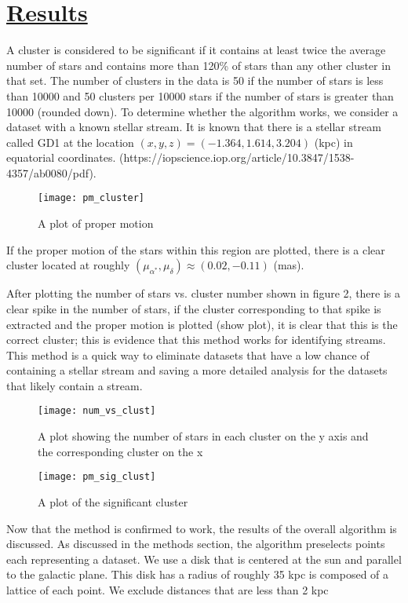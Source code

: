 \documentclass[12pt]{amsart}
\begin{document}
\section{\underline{Results}}
A cluster is considered to be significant if it contains at least twice the average number of stars and contains more than 120\% of stars than any other cluster in that set. The number of clusters in the data is 50 if the number of stars is less than 10000 and 50 clusters per 10000 stars if the number of stars is greater than 10000 (rounded down). To determine whether the algorithm works, we consider a dataset with a known stellar stream. It is known that there is a stellar stream called GD1 at the location $(x,y,z)=(-1.364, 1.614, 3.204)$ (kpc) 
in equatorial coordinates. (https://iopscience.iop.org/article/10.3847/1538-4357/ab0080/pdf). 

\begin{figure}[h]
\centering
\texttt{[image: pm\_cluster]}
\caption{A plot of proper motion}
\end{figure}


If the proper motion of the stars within this region are plotted, there is a clear cluster located at roughly $(\mu_{\alpha^*},\mu_{\delta}) \approx (0.02,-0.11)$ (mas).




After plotting the number of stars vs. cluster number shown in figure 2, there is a clear spike in the number of stars, if the cluster corresponding to that spike is extracted and the proper motion is plotted (show plot), it is clear that this is the correct cluster; this is evidence that this method works for identifying streams. This method is a quick way to eliminate datasets that have a low chance of containing a stellar stream and saving a more detailed analysis for the datasets that likely contain a stream. 

\begin{figure}[h]
\centering
\texttt{[image: num\_vs\_clust]}
\caption{A plot showing the number of stars in each cluster on the y axis and the corresponding cluster on the x}
\end{figure}

\begin{figure}[h]
\centering
\texttt{[image: pm\_sig\_clust]}
\caption{A plot of the significant cluster}
\end{figure}

Now that the method is confirmed to work, the results of the overall algorithm is discussed.
As discussed in the methods section, the algorithm preselects points each representing a dataset. We use a disk that is centered at the sun and parallel to the galactic plane. This disk has a radius of roughly 35 kpc is composed of a lattice of each point. We exclude distances that are less than 2 kpc
\end{document}
